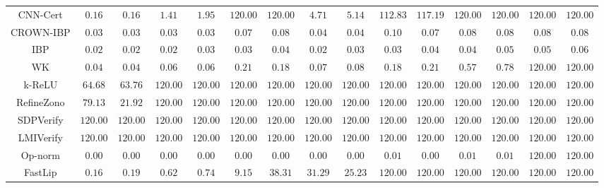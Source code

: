 \begin{table*}
{\begin{tabular}{c|c|c|c|c|c|c|c|c|c|c|c|c|c|c}
     CNN-Cert &        $0.16$ &        $0.16$ &        $1.41$ &        $1.95$ &      $120.00$ &      $120.00$ &        $4.71$ &        $5.14$ &      $112.83$ &      $117.19$ &      $120.00$ &      $120.00$ &      $120.00$ &      $120.00$ \\
    CROWN-IBP &        $0.03$ &        $0.03$ &        $0.03$ &        $0.03$ &        $0.07$ &        $0.08$ &        $0.04$ &        $0.04$ &        $0.10$ &        $0.07$ &        $0.08$ &        $0.08$ &        $0.08$ &        $0.08$ \\
          IBP &        $0.02$ &        $0.02$ &        $0.02$ &        $0.03$ &        $0.03$ &        $0.04$ &        $0.02$ &        $0.03$ &        $0.03$ &        $0.04$ &        $0.04$ &        $0.05$ &        $0.05$ &        $0.06$ \\
           WK &        $0.04$ &        $0.04$ &        $0.06$ &        $0.06$ &        $0.21$ &        $0.18$ &        $0.07$ &        $0.08$ &        $0.18$ &        $0.21$ &        $0.57$ &        $0.78$ &      $120.00$ &      $120.00$ \\
       k-ReLU &       $64.68$ &       $63.76$ &      $120.00$ &      $120.00$ &      $120.00$ &      $120.00$ &      $120.00$ &      $120.00$ &      $120.00$ &      $120.00$ &      $120.00$ &      $120.00$ &      $120.00$ &      $120.00$ \\
   RefineZono &       $79.13$ &       $21.92$ &      $120.00$ &      $120.00$ &      $120.00$ &      $120.00$ &      $120.00$ &      $120.00$ &      $120.00$ &      $120.00$ &      $120.00$ &      $120.00$ &      $120.00$ &      $120.00$ \\
    SDPVerify &      $120.00$ &      $120.00$ &      $120.00$ &      $120.00$ &      $120.00$ &      $120.00$ &      $120.00$ &      $120.00$ &      $120.00$ &      $120.00$ &      $120.00$ &      $120.00$ &      $120.00$ &      $120.00$ \\
    LMIVerify &      $120.00$ &      $120.00$ &      $120.00$ &      $120.00$ &      $120.00$ &      $120.00$ &      $120.00$ &      $120.00$ &      $120.00$ &      $120.00$ &      $120.00$ &      $120.00$ &      $120.00$ &      $120.00$ \\
      Op-norm &        $0.00$ &        $0.00$ &        $0.00$ &        $0.00$ &        $0.00$ &        $0.00$ &        $0.00$ &        $0.00$ &        $0.01$ &        $0.00$ &        $0.01$ &        $0.01$ &      $120.00$ &      $120.00$ \\
      FastLip &        $0.16$ &        $0.19$ &        $0.62$ &        $0.74$ &        $9.15$ &       $38.31$ &       $31.29$ &       $25.23$ &      $120.00$ &      $120.00$ &      $120.00$ &      $120.00$ &      $120.00$ &      $120.00$ \\

\end{tabular}}
\end{table*}
